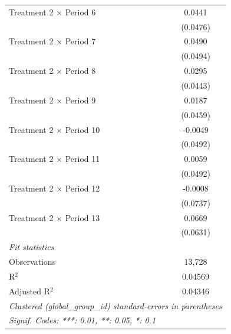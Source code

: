 \begin{longtable}{lc}
   Treatment 2 $\times$ Period 6   & 0.0441\\
                                   & (0.0476)\\
   Treatment 2 $\times$ Period 7   & 0.0490\\
                                   & (0.0494)\\
   Treatment 2 $\times$ Period 8   & 0.0295\\
                                   & (0.0443)\\
   Treatment 2 $\times$ Period 9   & 0.0187\\
                                   & (0.0459)\\
   Treatment 2 $\times$ Period 10  & -0.0049\\
                                   & (0.0492)\\
   Treatment 2 $\times$ Period 11  & 0.0059\\
                                   & (0.0492)\\
   Treatment 2 $\times$ Period 12  & -0.0008\\
                                   & (0.0737)\\
   Treatment 2 $\times$ Period 13  & 0.0669\\
                                   & (0.0631)\\
   \midrule
   \emph{Fit statistics}\\
   Observations                    & 13,728\\
   R$^2$                           & 0.04569\\
   Adjusted R$^2$                  & 0.04346\\
   \midrule \midrule
   \multicolumn{2}{l}{\emph{Clustered (global\_group\_id) standard-errors in parentheses}}\\
   \multicolumn{2}{l}{\emph{Signif. Codes: ***: 0.01, **: 0.05, *: 0.1}}\\
\end{longtable}
\par\endgroup

